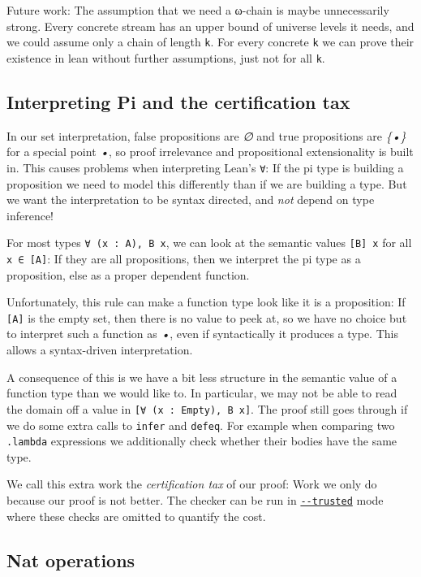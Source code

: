 \documentclass{article}
\newcommand\code[1]{\texttt{#1}}
\begin{document}
Future work: The assumption that we need a ω-chain is maybe unnecessarily strong. Every concrete stream has an upper bound of universe levels it needs, and we could assume only a chain of length \code{k}. For every concrete \code{k} we can prove their existence in lean without further assumptions, just not for all \code{k}.

\subsection*{Interpreting Pi and the certification tax}

In our set interpretation, false propositions are \emph{∅} and true propositions are \emph{\{•\}} for a special point \emph{•}, so proof irrelevance and propositional extensionality is built in. This causes problems when interpreting Lean’s \code{∀}: If the pi type is building a proposition we need to model this differently than if we are building a type. But we want the interpretation to be syntax directed, and \emph{not} depend on type inference!

For most types \code{∀ (x : A), B x}, we can look at the semantic values \code{[B] x} for all \code{x ∈ [A]}: If they are all propositions, then we interpret the pi type as a proposition, else as a proper dependent function.

Unfortunately, this rule can make a function type look like it is a proposition: If \code{[A]} is the empty set, then there is no value to peek at, so we have no choice but to interpret such a function as \emph{•}, even if syntactically it produces a type. This allows a syntax-driven interpretation.

A consequence of this is we have a bit less structure in the semantic value of a function type than we would like to. In particular, we may not be able to read the domain off a value in \code{[∀ (x : Empty), B x]}. The proof still goes through if we do some extra calls to \code{infer} and \code{defeq}. For example when comparing two \code{.lambda} expressions we additionally check whether their bodies have the same type.

We call this extra work the \emph{certification tax} of our proof: Work we only do because our proof is not better. The checker can be run in \href{https://github.com/leanprover/con-leche/blob/master/ConLeche/Driver/Cli.lean#L114}{\code{-{}-trusted}} mode where these checks are omitted to quantify the cost.

\subsection*{Nat operations}
\end{document}
